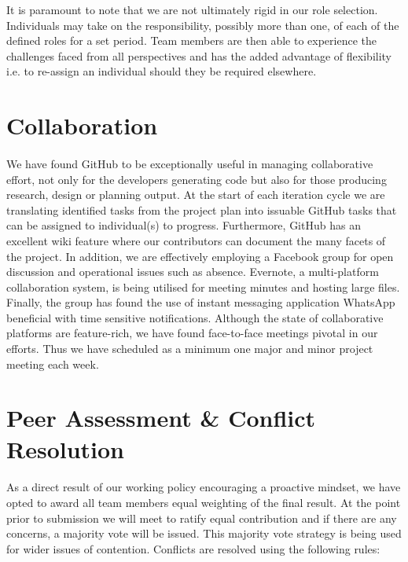 \documentclass[11pt,a4paper]{article}
\begin{document}
It is paramount to note that we are not ultimately rigid in our role selection.  Individuals may take on the responsibility, possibly more than one, of each of the defined roles for a set period.  Team members are then able to experience the challenges faced from all perspectives and has the added advantage of flexibility i.e. to re-assign an individual should they be required elsewhere.

\section{Collaboration}
\paragraph{}
We have found GitHub to be exceptionally useful in managing collaborative effort, not only for the developers generating code but also for those producing research, design or planning output.  At the start of each iteration cycle we are translating identified tasks from the project plan into issuable GitHub tasks that can be assigned to individual(s) to progress.  Furthermore, GitHub has an excellent wiki feature where our contributors can document the many facets of the project.
\newline
 In addition, we are effectively employing a Facebook group for open discussion and operational issues such as absence.  Evernote, a multi-platform collaboration system, is being utilised for meeting minutes and hosting large files.  Finally, the group has found the use of instant messaging application WhatsApp beneficial with time sensitive notifications.
\newline
 Although the state of collaborative platforms are feature-rich, we have found face-to-face meetings pivotal in our efforts.  Thus we have scheduled as a minimum one major and minor project meeting each week.

\section{Peer Assessment \& Conflict Resolution}
\paragraph{}
As a direct result of our working policy encouraging a proactive mindset, we have opted to award all team members equal weighting of the final result.  At the point prior to submission we will meet to ratify equal contribution and if there are any concerns, a majority vote will be issued.
This majority vote strategy is being used for wider issues of contention.  Conflicts are resolved using the following rules:
\end{document}

